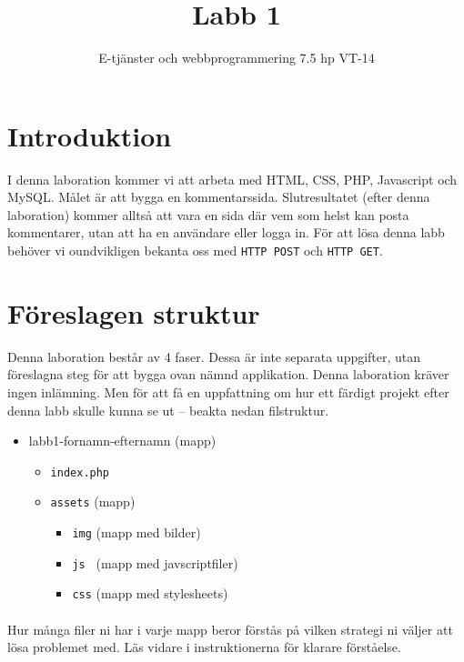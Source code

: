 \documentclass[12pt]{article}
\date{}
\title{ Labb 1 }
\author{ E-tjänster och webbprogrammering 7.5 hp VT-14 }
\begin{document}
\maketitle
\vspace{-2em}



\section{Introduktion}
I denna laboration kommer vi att arbeta med HTML, CSS, PHP, Javascript och MySQL. Målet är att bygga en kommentarssida. Slutresultatet (efter denna laboration) kommer alltså att vara en sida där vem som helst kan posta kommentarer, utan att ha en användare eller logga in. För att lösa denna labb behöver vi oundvikligen bekanta oss med \texttt{HTTP POST} och \texttt{HTTP GET}.


\section{Föreslagen struktur}
Denna laboration består av 4 faser. Dessa är inte separata uppgifter, utan föreslagna steg för att bygga ovan nämnd applikation. Denna laboration kräver ingen inlämning. Men för att få en uppfattning om hur ett färdigt projekt efter denna labb skulle kunna se ut -- beakta nedan filstruktur.
  \begin{itemize}
    \item labb1-fornamn-efternamn (mapp)
    \begin{itemize}
      \item \texttt{index.php} 
      \item \texttt{assets} (mapp)
      \begin{itemize}
        \item \texttt{img} (mapp med bilder)
        \item \texttt{js  } (mapp med javscriptfiler)
        \item \texttt{css} (mapp med stylesheets)
      \end{itemize}
    \end{itemize}
  \end{itemize}

\paragraph{}
Hur många filer ni har i varje mapp beror förstås på vilken strategi ni väljer att lösa problemet med. Läs vidare i instruktionerna för klarare förståelse.
\end{document}
